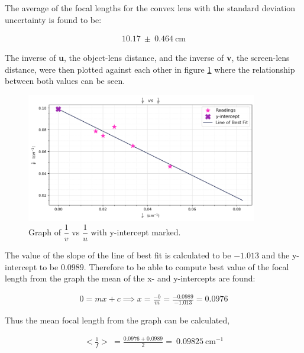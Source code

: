\documentclass[12pt]{article}
\begin{document}
The average of the focal lengths for the convex lens with the standard deviation uncertainty is found to be:

\vspace{-1.5em}
\begin{gather*}
    10.17 \: \pm \: 0.464 \: \text{cm}
\end{gather*}

The inverse of \textbf{u}, the object-lens distance, and the inverse of \textbf{v}, the screen-lens distance, were then plotted against each other in figure \ref{fig:convexgraph}
where the relationship between both values can be seen.

\begin{figure}[H]
    \centering
    \includegraphics[width=0.9\textwidth]{convex graph.png}
    \caption{\centering Graph of $\dfrac{1}{v}$ vs $\dfrac{1}{u}$ with y-intercept marked.}
    \label{fig:convexgraph}
\end{figure}

The value of the slope of the line of best fit is calculated to be $-1.013$ and the y-intercept to be $0.0989$. Therefore to be able to compute best value of the focal length from the graph 
the mean of the x- and y-intercepts are found:

\vspace{-1.5em}
\begin{gather*}
    0 = mx+c \implies x = \frac{-b}{m} = \frac{-0.0989}{-1.013}= 0.0976
\end{gather*}

Thus the mean focal length from the graph can be calculated,

\vspace{-1.5em}
\begin{gather*}
    <\frac{1}{f}> \: = \frac{0.0976 + 0.0989}{2} = \: 0.09825 \: \text{cm}^{-1}
\end{gather*}
\end{document}
